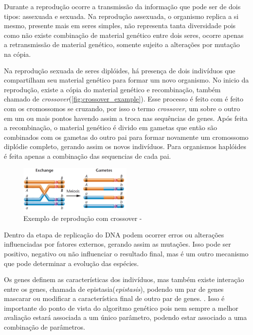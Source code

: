 Durante a reprodução ocorre a transmissão da informação que pode ser de dois tipos: assexuada e sexuada. Na reprodução assexuada, o organismo replica a si mesmo, presente mais em seres simples, não representa tanta diversidade pois como não existe combinação de material genético entre dois seres, ocorre apenas a retransmissão de material genético, somente sujeito a alterações por mutação na cópia.

Na reprodução sexuada de seres diplóides, há presença de dois indivíduos que compartilham seu material genético para formar um novo organismo. No inicio da reprodução, existe a cópia do material genético e recombinação, também chamado de \textit{crossover}(\autoref{fig:crossover_example}). Esse processo é feito com é feito com os cromossomos se cruzando, por isso o termo \textit{crossover},  um sobre o outro em um ou mais pontos havendo assim a troca nas sequências de genes. Após feita a recombinação, o material genético é divido em gametas que então são combinados com os gametas do outro pai para formar novamente um cromossomo diplódie completo, gerando assim os novos indivíduos. Para organismos haplóides é feita apenas a combinação das sequencias de cada pai.

\begin{figure}
	\begin{center}
	\includegraphics[width=0.5\textwidth]{imagens/cross_over.png}
	\caption{Exemplo de reprodução com crossover - \cite{Klug2011}}
	\label{fig:crossover_example}
	\end{center}
\end{figure}


Dentro da etapa de replicação do DNA podem ocorrer erros ou alterações influenciadas por fatores externos, gerando assim as mutações. Isso pode ser positivo, negativo ou não influenciar o resultado final, mas é um outro mecanismo que pode determinar a evolução das espécies.

Os genes definem as características dos indivíduos, mas também existe interação entre os genes, chamada de epistasia(\textit{epistasis}), podendo um par de genes mascarar ou modificar a característica final de outro par de genes. \cite{Klug2011}. Isso é importante do ponto de vista do algoritmo genético pois nem sempre a melhor avaliação estará associada a um único parâmetro, podendo estar associado a uma combinação de parâmetros.

